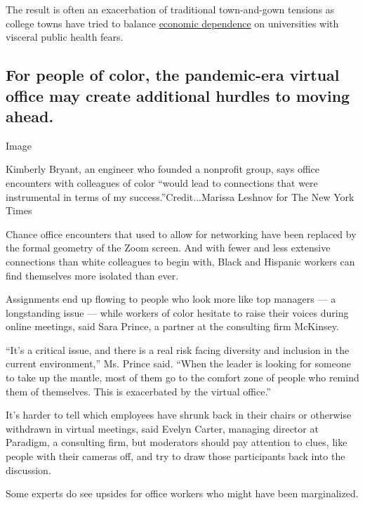 The result is often an exacerbation of traditional town-and-gown
tensions as college towns have tried to balance
\href{https://www.nytimes3xbfgragh.onion/2020/06/28/us/coronavirus-college-towns.html}{economic
dependence} on universities with visceral public health fears.

\hypertarget{for-people-of-color-the-pandemic-era-virtual-office-may-create-additional-hurdles-to-moving-ahead}{%
\subsection{For people of color, the pandemic-era virtual office may
create additional hurdles to moving
ahead.}\label{for-people-of-color-the-pandemic-era-virtual-office-may-create-additional-hurdles-to-moving-ahead}}

Image

Kimberly Bryant, an engineer who founded a nonprofit group, says office
encounters with colleagues of color ``would lead to connections that
were instrumental in terms of my success.''Credit...Marissa Leshnov for
The New York Times

Chance office encounters that used to allow for networking have been
replaced by the formal geometry of the Zoom screen. And with fewer and
less extensive connections than white colleagues to begin with, Black
and Hispanic workers can find themselves more isolated than ever.

Assignments end up flowing to people who look more like top managers ---
a longstanding issue --- while workers of color hesitate to raise their
voices during online meetings, said Sara Prince, a partner at the
consulting firm McKinsey.

``It's a critical issue, and there is a real risk facing diversity and
inclusion in the current environment,'' Ms. Prince said. ``When the
leader is looking for someone to take up the mantle, most of them go to
the comfort zone of people who remind them of themselves. This is
exacerbated by the virtual office.''

It's harder to tell which employees have shrunk back in their chairs or
otherwise withdrawn in virtual meetings, said Evelyn Carter, managing
director at Paradigm, a consulting firm, but moderators should pay
attention to clues, like people with their cameras off, and try to draw
those participants back into the discussion.

Some experts do see upsides for office workers who might have been
marginalized.

